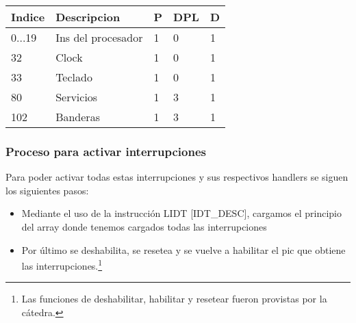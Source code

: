\begin{tabular}{l l l l l}
Indice & Descripcion & P & DPL & D\\

\hline
0...19 & Ins del procesador & 1 & 0 & 1 \\
32 & Clock & 1 & 0 & 1\\
33 & Teclado	 & 1 & 0 & 1\\
80 & Servicios & 1 & 3 & 1\\
102 & Banderas & 1 & 3 & 1\\
\end{tabular}

\subsubsection{Proceso para activar interrupciones}

Para poder activar todas estas interrupciones y sus respectivos handlers se siguen los siguientes pasos:\\
\begin{itemize}
 \item Mediante el uso de la instrucci\'on LIDT [IDT\_DESC], cargamos el principio del array donde tenemos cargados todas las interrupciones
 \item Por \'ultimo se deshabilita, se resetea y se vuelve a habilitar el pic que obtiene las interrupciones.\footnote{Las funciones de 
deshabilitar, habilitar y resetear fueron provistas por la c\'atedra.}
\end{itemize}
